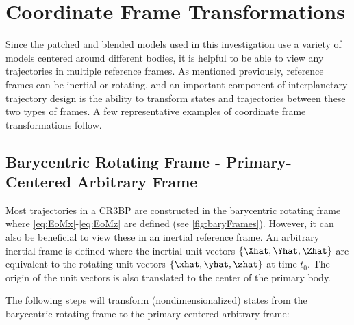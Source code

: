 \section{Coordinate Frame Transformations}
Since the patched and blended models used in this investigation use a variety of models centered
around different bodies, it is helpful to be able to view any trajectories in multiple reference
frames. As mentioned previously, reference frames can be inertial or rotating, and an important
component of interplanetary trajectory design is the ability to transform states and trajectories
between these two types of frames. A few representative examples of coordinate frame
transformations follow.

\subsection{Barycentric Rotating Frame - Primary-Centered Arbitrary Frame}
Most trajectories in a CR3BP are constructed in the barycentric rotating frame where
\cref{eq:EoMx}-\cref{eq:EoMz} are defined (see \cref{fig:baryFrames}). However, it can also be
beneficial to view these in an inertial reference frame. An arbitrary inertial frame is defined
where the inertial unit vectors $\{\Xhat,\Yhat,\Zhat\}$ are equivalent to the rotating unit
vectors $\{\xhat,\yhat,\zhat\}$ at time $t_{0}$. The origin of the unit vectors is also translated
to the center of the primary body.

The following steps will transform (nondimensionalized) states from the barycentric rotating frame
to the primary-centered arbitrary frame:

